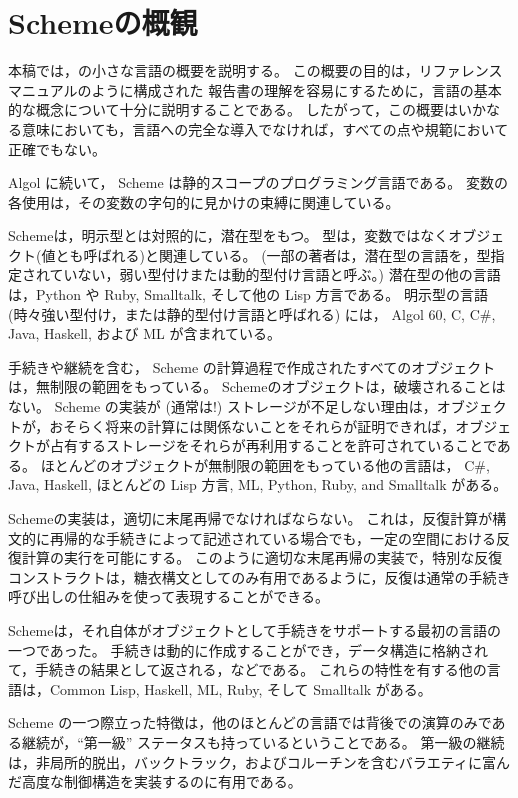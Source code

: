 \chapter*{Schemeの概観}

本稿では，\rsevenrs の小さな言語の概要を説明する。
この概要の目的は，リファレンスマニュアルのように構成された \rsevenrs{} 報告書の理解を容易にするために，言語の基本的な概念について十分に説明することである。
したがって，この概要はいかなる意味においても，言語への完全な導入でなければ，すべての点や規範において正確でもない。

\vest Algol に続いて， Scheme は静的スコープのプログラミング言語である。
変数の各使用は，その変数の字句的に見かけの束縛に関連している。

\vest Schemeは，明示型とは対照的に，潜在型をもつ。
型は，変数ではなくオブジェクト(値とも呼ばれる)と関連している。
(一部の著者は，潜在型の言語を，型指定されていない，弱い型付けまたは動的型付け言語と呼ぶ。)
潜在型の他の言語は，Python や Ruby, Smalltalk, そして他の Lisp 方言である。
明示型の言語 (時々強い型付け，または静的型付け言語と呼ばれる) には， Algol 60, C, C\#, Java, Haskell, および ML が含まれている。

\vest 手続きや継続を含む， Scheme の計算過程で作成されたすべてのオブジェクトは，無制限の範囲をもっている。
Schemeのオブジェクトは，破壊されることはない。
Scheme の実装が (通常は!) ストレージが不足しない理由は，オブジェクトが，おそらく将来の計算には関係ないことをそれらが証明できれば，オブジェクトが占有するストレージをそれらが再利用することを許可されていることである。
ほとんどのオブジェクトが無制限の範囲をもっている他の言語は， C\#, Java, Haskell, ほとんどの Lisp 方言, ML, Python, Ruby, and Smalltalk がある。

Schemeの実装は，適切に末尾再帰でなければならない。
これは，反復計算が構文的に再帰的な手続きによって記述されている場合でも，一定の空間における反復計算の実行を可能にする。
このように適切な末尾再帰の実装で，特別な反復コンストラクトは，糖衣構文としてのみ有用であるように，反復は通常の手続き呼び出しの仕組みを使って表現することができる。

\vest Schemeは，それ自体がオブジェクトとして手続きをサポートする最初の言語の一つであった。
手続きは動的に作成することができ，データ構造に格納されて，手続きの結果として返される，などである。
これらの特性を有する他の言語は，Common Lisp, Haskell, ML, Ruby, そして Smalltalk がある。

\vest Scheme の一つ際立った特徴は，他のほとんどの言語では背後での演算のみである継続が，``第一級'' ステータスも持っているということである。
第一級の継続は，非局所的脱出，バックトラック，およびコルーチンを含むバラエティに富んだ高度な制御構造を実装するのに有用である。

